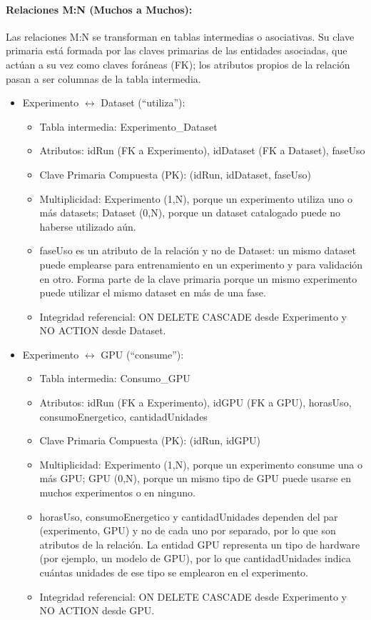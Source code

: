 \documentclass[12pt,a4paper]{article}
\begin{document}
\paragraph{Relaciones M:N (Muchos a Muchos):}

Las relaciones M:N se transforman en tablas intermedias o asociativas. Su clave primaria está formada por las claves primarias de las entidades asociadas, que actúan a su vez como claves foráneas (FK); los atributos propios de la relación pasan a ser columnas de la tabla intermedia.

{\begin{itemize}
  \item Experimento $\leftrightarrow$ Dataset (``utiliza''):
  \begin{itemize}
  \item Tabla intermedia: Experimento\_Dataset
  \item Atributos: idRun (FK a Experimento), idDataset (FK a Dataset), faseUso
  \item Clave Primaria Compuesta (PK): (idRun, idDataset, faseUso)
  \item Multiplicidad: Experimento (1,N), porque un experimento utiliza uno o más datasets; Dataset (0,N), porque un dataset catalogado puede no haberse utilizado aún.
  \item faseUso es un atributo de la relación y no de Dataset: un mismo dataset puede emplearse para entrenamiento en un experimento y para validación en otro. Forma parte de la clave primaria porque un mismo experimento puede utilizar el mismo dataset en más de una fase.
  \item Integridad referencial: ON DELETE CASCADE desde Experimento y NO ACTION desde Dataset.
  \end{itemize}
  \item Experimento $\leftrightarrow$ GPU (``consume''):
  \begin{itemize}
  \item Tabla intermedia: Consumo\_GPU
  \item Atributos: idRun (FK a Experimento), idGPU (FK a GPU), horasUso, consumoEnergetico, cantidadUnidades
  \item Clave Primaria Compuesta (PK): (idRun, idGPU)
  \item Multiplicidad: Experimento (1,N), porque un experimento consume una o más GPU; GPU (0,N), porque un mismo tipo de GPU puede usarse en muchos experimentos o en ninguno.
  \item horasUso, consumoEnergetico y cantidadUnidades dependen del par (experimento, GPU) y no de cada uno por separado, por lo que son atributos de la relación. La entidad GPU representa un tipo de hardware (por ejemplo, un modelo de GPU), por lo que cantidadUnidades indica cuántas unidades de ese tipo se emplearon en el experimento.
  \item Integridad referencial: ON DELETE CASCADE desde Experimento y NO ACTION desde GPU.
  \end{itemize}
\end{itemize}
}
\end{document}
